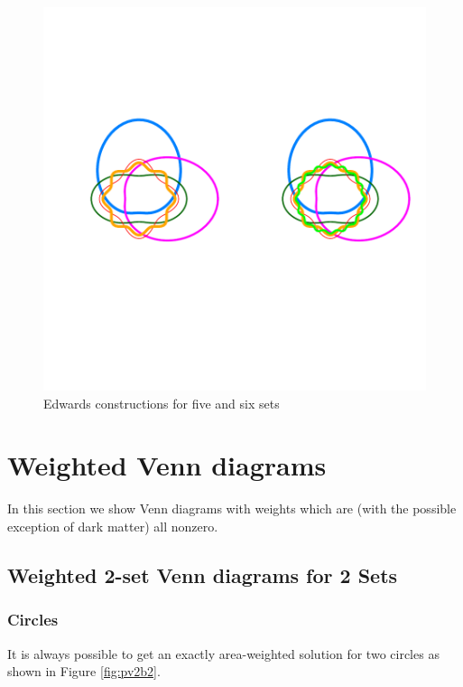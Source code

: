 \documentclass[a4paper]{article}
\begin{document}
\begin{figure}[H]\begin{center}
\includegraphics{Vennfig-S47fig}
\caption{Edwards constructions for five and six sets}
\end{center}\end{figure}











\newpage
\section{Weighted Venn diagrams}
In this section we show Venn diagrams with weights
which are (with the possible exception of dark matter) all nonzero.



\subsection{Weighted 2-set Venn diagrams for 2 Sets}
\subsubsection{Circles}
It is always possible to get an exactly area-weighted solution for two circles 
as shown in Figure \ref{fig:pv2b2}.
\end{document}
